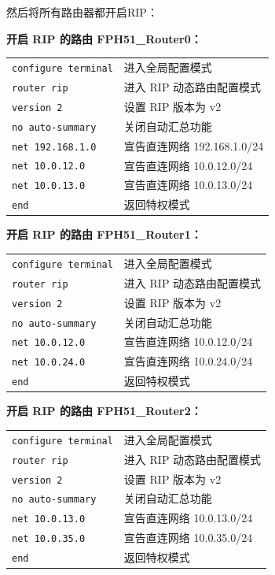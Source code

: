 \documentclass[UTF8,12pt,a4paper]{ctexart}
\begin{document}
\vspace{1em}
然后将所有路由器都开启RIP：

\noindent\textbf{开启 RIP 的路由 FPH51\_Router0：}

\medskip
\begin{tabular}{p{7cm} p{7cm}}
\texttt{configure terminal} & 进入全局配置模式 \\
\texttt{router rip} & 进入 RIP 动态路由配置模式 \\
\texttt{version 2} & 设置 RIP 版本为 v2 \\
\texttt{no auto-summary} & 关闭自动汇总功能 \\
\texttt{net 192.168.1.0} & 宣告直连网络 192.168.1.0/24 \\
\texttt{net 10.0.12.0} & 宣告直连网络 10.0.12.0/24 \\
\texttt{net 10.0.13.0} & 宣告直连网络 10.0.13.0/24 \\
\texttt{end} & 返回特权模式 \\
\end{tabular}

\bigskip
\noindent\textbf{开启 RIP 的路由 FPH51\_Router1：}

\medskip
\begin{tabular}{p{7cm} p{7cm}}
\texttt{configure terminal} & 进入全局配置模式 \\
\texttt{router rip} & 进入 RIP 动态路由配置模式 \\
\texttt{version 2} & 设置 RIP 版本为 v2 \\
\texttt{no auto-summary} & 关闭自动汇总功能 \\
\texttt{net 10.0.12.0} & 宣告直连网络 10.0.12.0/24 \\
\texttt{net 10.0.24.0} & 宣告直连网络 10.0.24.0/24 \\
\texttt{end} & 返回特权模式 \\
\end{tabular}

\bigskip
\noindent\textbf{开启 RIP 的路由 FPH51\_Router2：}

\medskip
\begin{tabular}{p{7cm} p{7cm}}
\texttt{configure terminal} & 进入全局配置模式 \\
\texttt{router rip} & 进入 RIP 动态路由配置模式 \\
\texttt{version 2} & 设置 RIP 版本为 v2 \\
\texttt{no auto-summary} & 关闭自动汇总功能 \\
\texttt{net 10.0.13.0} & 宣告直连网络 10.0.13.0/24 \\
\texttt{net 10.0.35.0} & 宣告直连网络 10.0.35.0/24 \\
\texttt{end} & 返回特权模式 \\
\end{tabular}
\end{document}
